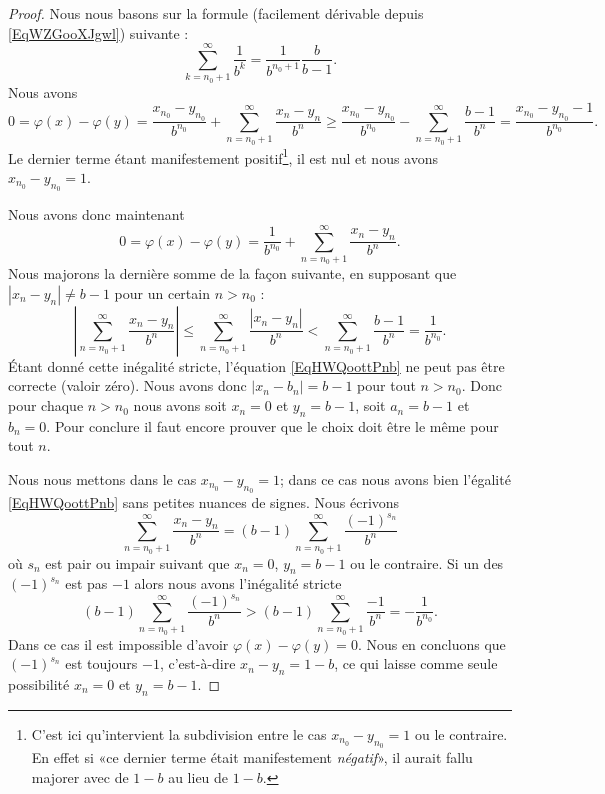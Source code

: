 \begin{proof}
	Nous nous basons sur la formule (facilement dérivable depuis \eqref{EqWZGooXJgwl}) suivante :
	\begin{equation}
		\sum_{k=n_0+1}^{\infty}\frac{1}{ b^k }=\frac{1}{ b^{n_0+1} }\frac{ b }{ b-1 }.
	\end{equation}
	Nous avons
	\begin{equation}
		0=\varphi(x)-\varphi(y)=\frac{ x_{n_0}-y_{n_0} }{ b^{n_0} }+\sum_{n=n_0+1}^{\infty}\frac{ x_n-y_n }{ b^n }\geq \frac{ x_{n_0}-y_{n_0} }{ b^{n_0} }-\sum_{n=n_0+1}^{\infty}\frac{ b-1 }{ b^n }=\frac{ x_{n_0}-y_{n_0}-1 }{ b^{n_0} }.
	\end{equation}
	Le dernier terme étant manifestement positif\footnote{C'est ici qu'intervient la subdivision entre le cas \( x_{n_0}-y_{n_0}=1\) ou le contraire. En effet si «ce dernier terme était manifestement \emph{négatif}», il aurait fallu majorer avec de \( 1-b\) au lieu de \( 1-b\).}, il est nul et nous avons \( x_{n_0}-y_{n_0}=1\).

	Nous avons donc maintenant
	\begin{equation}    \label{EqHWQoottPnb}
		0=\varphi(x)-\varphi(y)=\frac{1}{ b^{n_0} }+\sum_{n=n_0+1}^{\infty}\frac{ x_n-y_n }{ b^n }.
	\end{equation}
	Nous majorons la dernière somme de la façon suivante, en supposant que \( | x_n-y_n |\neq b-1\) pour un certain \( n>n_0\) :
	\begin{equation}
		\left| \sum_{n=n_0+1}^{\infty}\frac{ x_n-y_n }{ b^n } \right| \leq\sum_{n=n_0+1}^{\infty}\frac{ | x_n-y_n | }{ b^n }<\sum_{n=n_0+1}^{\infty}\frac{ b-1 }{ b^n }=\frac{1}{ b^{n_0} }.
	\end{equation}
	Étant donné cette inégalité stricte, l'équation \eqref{EqHWQoottPnb} ne peut pas être correcte (valoir zéro). Nous avons donc \( | x_n-b_n |=b-1\) pour tout \( n>n_0\). Donc pour chaque \( n>n_0\) nous avons soit \( x_n=0\) et \( y_n=b-1\), soit \( a_n=b-1\) et \( b_n=0\). Pour conclure il faut encore prouver que le choix doit être le même pour tout \( n\).

	Nous nous mettons dans le cas \( x_{n_0}-y_{n_0}=1\); dans ce cas nous avons bien l'égalité \eqref{EqHWQoottPnb} sans petites nuances de signes. Nous écrivons
	\begin{equation}
		\sum_{n=n_0+1}^{\infty}\frac{ x_n-y_n }{ b^n }=(b-1)\sum_{n=n_0+1}^{\infty}\frac{ (-1)^{s_n} }{ b^n }
	\end{equation}
	où \( s_n\) est pair ou impair suivant que \( x_n=0\), \( y_n=b-1\) ou le contraire. Si un des \( (-1)^{s_n}\) est pas \( -1\) alors nous avons l'inégalité stricte
	\begin{equation}
		(b-1)\sum_{n=n_0+1}^{\infty}\frac{ (-1)^{s_n} }{ b^n }>(b-1)\sum_{n=n_0+1}^{\infty}\frac{-1}{ b^n }=-\frac{1}{ b^{n_0} }.
	\end{equation}
	Dans ce cas il est impossible d'avoir \( \varphi(x)-\varphi(y)=0\). Nous en concluons que \( (-1)^{s_n}\) est toujours \( -1\), c'est-à-dire \( x_n-y_n=1-b\), ce qui laisse comme seule possibilité \( x_n=0\) et \( y_n=b-1\).
\end{proof}

